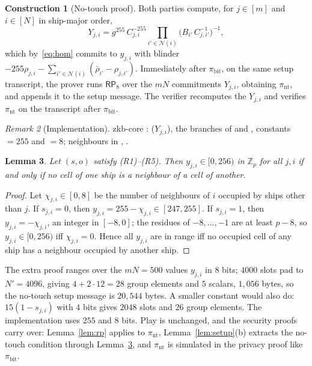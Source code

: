 \documentclass[11pt]{article}
\newtheorem{lemma}{Lemma}[section]
\theoremstyle{definition}
\newtheorem{construction}[lemma]{Construction}
\theoremstyle{remark}
\newtheorem{remark}[lemma]{Remark}
\newcommand{\Z}{\mathbb{Z}}
\newcommand{\RP}{\mathsf{RP}}
\begin{document}
\begin{construction}[No-touch proof]\label{con:notouch}
Both parties compute, for $j\in[m]$ and $i\in[N]$ in ship-major order,
\[
  Y_{j,i}=g^{255}\,C_{j,i}^{-255}\prod_{i'\in\mathcal N(i)}\bigl(B_{i'}\,C_{j,i'}^{-1}\bigr)^{-1},
\]
which by~\eqref{eq:hom} commits to $y_{j,i}$ with blinder $-255\rho_{j,i}-\sum_{i'\in\mathcal N(i)}(\bar\rho_{i'}-\rho_{j,i'})$. Immediately after $\pi_{\mathrm{bit}}$, on the same setup transcript, the prover runs $\RP_8$ over the $mN$ commitments $Y_{j,i}$, obtaining $\pi_{\mathrm{nt}}$, and appends it to the setup message. The verifier recomputes the $Y_{j,i}$ and verifies $\pi_{\mathrm{nt}}$ on the transcript after $\pi_{\mathrm{bit}}$.
\end{construction}

\begin{remark}[Implementation]\label{rem:impl-notouch}
zkb-core :  ($Y_{j,i}$), the  branches of  and , constants  $=255$ and  $=8$; neighbours in , .
\end{remark}

\begin{lemma}\label{lem:notouch}
Let $(s,o)$ satisfy (R1)--(R5). Then $y_{j,i}\in[0,256)$ in $\Z_p$ for all $j,i$ if and only if no cell of one ship is a neighbour of a cell of another.
\end{lemma}
\begin{proof}
Let $\chi_{j,i}\in[0,8]$ be the number of neighbours of $i$ occupied by ships other than $j$. If $s_{j,i}=0$, then $y_{j,i}=255-\chi_{j,i}\in[247,255]$. If $s_{j,i}=1$, then $y_{j,i}=-\chi_{j,i}$, an integer in $[-8,0]$; the residues of $-8,\ldots,-1$ are at least $p-8$, so $y_{j,i}\in[0,256)$ iff $\chi_{j,i}=0$. Hence all $y_{j,i}$ are in range iff no occupied cell of any ship has a neighbour occupied by another ship.
\end{proof}

The extra proof ranges over the $mN=500$ values $y_{j,i}$ in $8$ bits; $4000$ slots pad to $N'=4096$, giving $4+2\cdot12=28$ group elements and $5$ scalars, $1{,}056$ bytes, so the no-touch setup message is $20{,}544$ bytes. A smaller constant would also do: $15(1-s_{j,i})$ with $4$ bits gives $2048$ slots and $26$ group elements. The implementation uses $255$ and $8$ bits. Play is unchanged, and the security proofs carry over: Lemma~\ref{lem:rp} applies to $\pi_{\mathrm{nt}}$, Lemma~\ref{lem:setup}(b) extracts the no-touch condition through Lemma~\ref{lem:notouch}, and $\pi_{\mathrm{nt}}$ is simulated in the privacy proof like $\pi_{\mathrm{bit}}$.
\end{document}
